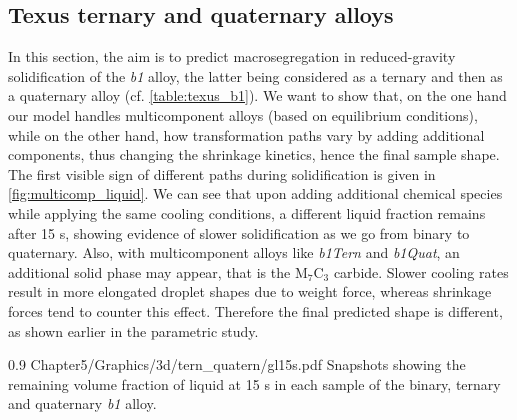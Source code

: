 \subsection{Texus ternary and quaternary alloys}

In this section, the aim is to predict macrosegregation in reduced-gravity solidification of the \emph{b1} alloy, the latter being considered 
as a ternary and then as a quaternary alloy (cf. \cref{table:texus_b1}). 
We want to show that, on the one hand our model handles multicomponent alloys (based on equilibrium conditions), while
on the other hand, how transformation paths vary by adding additional components, thus changing the shrinkage kinetics, hence the final sample shape.
The first visible sign of different paths during solidification is given in \cref{fig:multicomp_liquid}. We can see that upon adding
additional chemical species while applying the same cooling conditions, a different liquid fraction remains after 15 s, showing evidence 
of slower solidification as we go from binary to quaternary. Also, with multicomponent alloys like \emph{b1Tern} and \emph{b1Quat}, an additional solid
phase may appear, that is the M$_7$C$_3$ carbide.
Slower cooling rates result in more elongated droplet shapes due to weight force, whereas shrinkage forces tend to counter this effect.
Therefore the final predicted shape is different, as shown earlier in the parametric study.

\begin{figureth}
{0.9}
{Chapter5/Graphics/3d/tern_quatern/gl15s.pdf}
{Snapshots showing the remaining volume fraction of liquid at 15 s in each sample of the binary, ternary and quaternary \emph{b1} alloy.}
\label{fig:multicomp_liquid}
\end{figureth}

